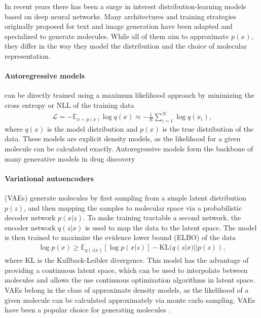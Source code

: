 In recent years there has been a surge in interest distribution-learning models based on deep neural
networks. Many architectures and training strategies originally proposed for text and image
generation have been adapted and specialized to generate molecules. While all of them aim to
approximate $p(x)$, they differ in the way they model the distribution and the choice of molecular
representation.

\paragraph{Autoregressive models} can be directly trained using a maximum likelihood approach by
minimizing the cross entropy or \ac{NLL} of the training data
\begin{align}
      \mathcal{L} = - \mathbb{E}_{x \sim p(x)} \log q(x) \approx - \frac{1}{N} \sum_{i=1}^N \log q(x_i),
\end{align}
where $q(x)$ is the model distribution and $p(x)$ is the true distribution of the data. These models
are explicit density models, as the likelihood for a given molecule can be calculated exactly.
Autoregressive models form the backbone of many generative models in drug discovery
\citep{gomez-bombarelliAutomaticChemicalDesign2018,seglerGeneratingFocusedMolecule2018,olivecronaMolecularDenovoDesign2017,guoAugmentedMemoryCapitalizing2023,thomasAugmentedHillClimbIncreases2022,jaquesSequenceTutorConservative2016,cohen-karlikOvercomingOrderAutoregressive2024,}

\paragraph{Variational autoencoders} (VAEs) \citep{kingmaAutoEncodingVariationalBayes2013} generate molecules by first
sampling from a simple latent distribution $p(z)$, and then mapping the samples to molecular space
via a probabilistic decoder network $p(x|z)$. To make training tractable a second network, the
encoder network $q(z|x)$ is used to map the data to the latent space. The model is then trained to
maximize the evidence lower bound (ELBO) of the data
\begin{align}
      \log p(x) \geq \mathbb{E}_{q(z|x)}[\log p(x|z)] - \text{KL}(q(z|x) || p(z)),
\end{align}
where KL is the Kullback-Leibler divergence. This model has the advantage of providing a continuous
latent space, which can be used to interpolate between molecules and allows the use continuous
optimization algorithms in latent space. VAEs belong in the class of approximate density models, as
the likelihood of a given molecule can be calculated approximately via monte carlo sampling. VAEs
have been a popular choice for generating molecules
\citep{gomez-bombarelliAutomaticChemicalDesign2018,kusnerGrammarVariationalAutoencoder2017,simonovskyGraphVAEGenerationSmall2018,samantaNeVAEDeepGenerative2018,jinJunctionTreeVariational2018,daiSyntaxDirectedVariationalAutoencoder2018}.


